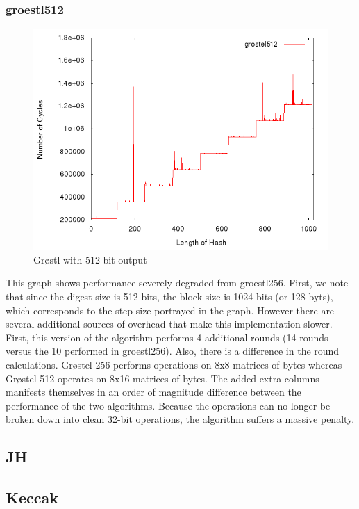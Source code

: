 \documentclass[10pt,a4paper]{article}
\begin{document}
\subsubsection{groestl512}
    \begin{figure}[H]
        \begin{center}
            \includegraphics[scale=0.5]{images/grostel512.png} 
            \caption{Gr{\o}stl with 512-bit output}
        \end{center}
    \end{figure}
This graph shows performance severely degraded from groestl256.  First, we note that since the digest size is 512 bits, the block size is 1024 bits (or 128 byts), which corresponds to the step size portrayed in the graph.  However there are several additional sources of overhead that make this implementation slower.  First, this version of the algorithm performs 4 additional rounds (14 rounds versus the 10 performed in groestl256).  Also, there is a difference in the round calculations.  Gr{\o}stel-256 performs operations on 8x8 matrices of bytes whereas Gr{\o}stel-512 operates on 8x16 matrices of bytes.  The added extra columns manifests themselves in an order of magnitude difference between the performance of the two algorithms.  Because the operations can no longer be broken down into clean 32-bit operations, the algorithm suffers a massive penalty.

\subsection{JH}

\subsection{Keccak}

\end{document}
